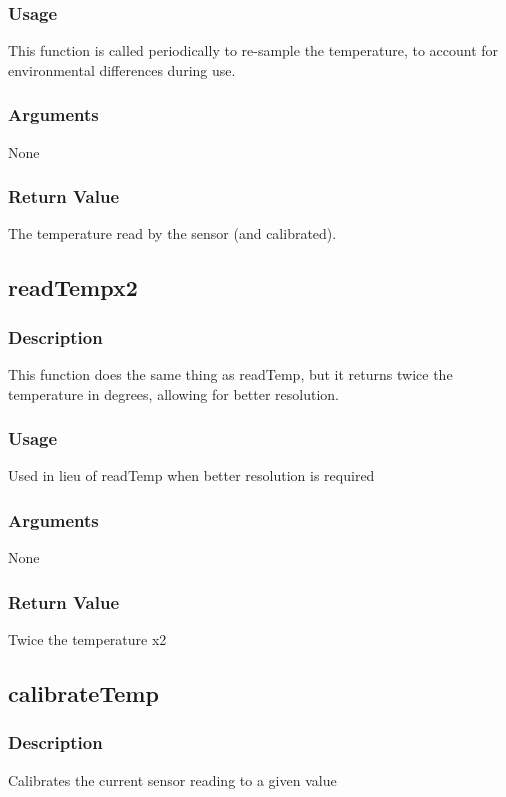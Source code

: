 \documentclass[]{report}
\begin{document}
\subsubsection{Usage}
This function is called periodically to re-sample the temperature, to account for environmental differences during use.

\subsubsection{Arguments}
None

\subsubsection{Return Value}
The temperature read by the sensor (and calibrated).

\subsection{readTempx2}
\subsubsection{Description}
This function does the same thing as readTemp, but it returns twice the temperature in degrees, allowing for better resolution.

\subsubsection{Usage}
Used in lieu of readTemp when better resolution is required

\subsubsection{Arguments}
None

\subsubsection{Return Value}
Twice the temperature x2

\subsection{calibrateTemp}
\subsubsection{Description}
Calibrates the current sensor reading to a given value
\end{document}
